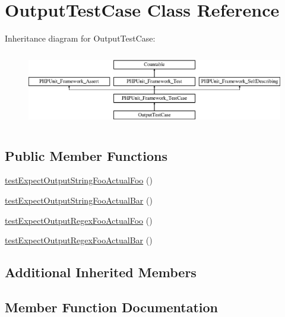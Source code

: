 \hypertarget{class_output_test_case}{}\section{Output\+Test\+Case Class Reference}
\label{class_output_test_case}
Inheritance diagram for Output\+Test\+Case\+:\begin{figure}[H]
\begin{center}
\leavevmode
\includegraphics[height=3.303835cm]{class_output_test_case}
\end{center}
\end{figure}
\subsection*{Public Member Functions}
\begin{DoxyCompactItemize}
\item 
\mbox{\hyperlink{class_output_test_case_ae66153b89cf146126a29b984028bd88a}{test\+Expect\+Output\+String\+Foo\+Actual\+Foo}} ()
\item 
\mbox{\hyperlink{class_output_test_case_ae0410ef6e54644afb5cf8ca7271b4bd7}{test\+Expect\+Output\+String\+Foo\+Actual\+Bar}} ()
\item 
\mbox{\hyperlink{class_output_test_case_a35a5bd5a2b6809cbe8176b7fd8092bd1}{test\+Expect\+Output\+Regex\+Foo\+Actual\+Foo}} ()
\item 
\mbox{\hyperlink{class_output_test_case_a243376e2ecc8e5ed9fc0238934387bc0}{test\+Expect\+Output\+Regex\+Foo\+Actual\+Bar}} ()
\end{DoxyCompactItemize}
\subsection*{Additional Inherited Members}


\subsection{Member Function Documentation}
\mbox{\label{class_output_test_case_a243376e2ecc8e5ed9fc0238934387bc0}} 
